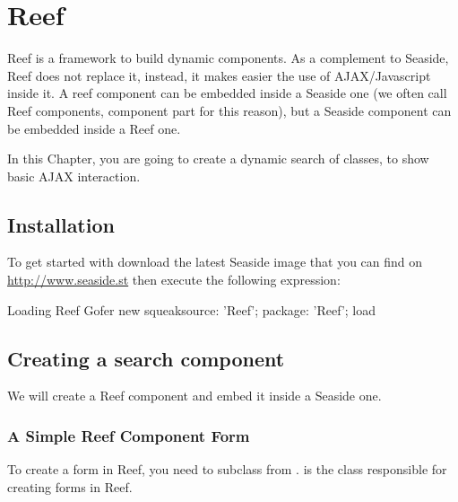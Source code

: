 \documentclass[a4paper,10pt,twoside]{book}
\begin{document}
\fi
\sloppy


\chapter{Reef}

Reef is a framework to build dynamic components. As a complement to Seaside, Reef does not replace it, instead, it makes easier the use of AJAX/Javascript inside it. A reef component can be embedded inside a Seaside one (we often call Reef components, component part for this reason), but a Seaside component can be embedded inside a Reef one. 

In this Chapter, you are going to create a dynamic search of classes, to show basic AJAX interaction.


\section{Installation}

To get started with download the latest Seaside image that you can find on \url{http://www.seaside.st} then execute the following expression:

\begin{code}{Loading Reef}
Gofer new
	squeaksource: 'Reef';
	package: 'Reef';
	load
\end{code}


\section{Creating a search component}

We will create a Reef component and embed it inside a Seaside one. 


\subsection{A Simple Reef Component Form}

To create a form in Reef, you need to subclass from .  is the class responsible for creating forms in Reef. 
\end{document}
